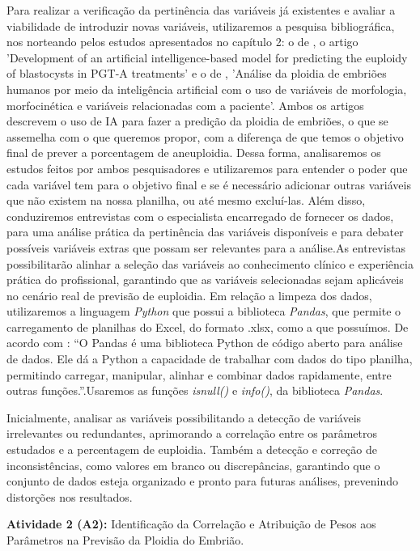Para realizar a verificação da pertinência das variáveis já existentes e avaliar a viabilidade de introduzir novas variáveis, utilizaremos a pesquisa bibliográfica, nos norteando pelos estudos apresentados no capítulo 2: o de , o artigo 'Development of an artificial intelligence-based model for predicting the euploidy of blastocysts in PGT-A treatments' e o de , 'Análise da ploidia de embriões humanos por meio da inteligência artificial com o uso de variáveis de morfologia, morfocinética e variáveis relacionadas com a paciente'. Ambos os artigos descrevem o uso de IA para fazer a predição da ploidia de embriões, o que se assemelha com o que queremos propor, com a diferença de que temos o objetivo final de prever a porcentagem de aneuploidia. Dessa forma, analisaremos os estudos feitos por ambos pesquisadores e utilizaremos para entender o poder que cada variável tem para o objetivo final e se é necessário adicionar outras variáveis que não existem na nossa planilha, ou até mesmo excluí-las. Além disso, conduziremos entrevistas com o especialista encarregado de fornecer os dados, para uma análise prática da pertinência das variáveis disponíveis e para debater possíveis variáveis extras que possam ser relevantes para a análise.As entrevistas possibilitarão alinhar a seleção das variáveis ao conhecimento clínico e experiência prática do profissional, garantindo que as variáveis selecionadas sejam aplicáveis no cenário real de previsão de euploidia. Em relação a limpeza dos dados, utilizaremos a linguagem \textit{Python} que possui a biblioteca \textit{Pandas}, que permite o carregamento de planilhas do Excel, do formato .xlsx, como a que possuímos. De acordo com : “O Pandas é uma biblioteca Python de código aberto para análise de dados. Ele dá a Python a capacidade de trabalhar com dados do tipo planilha, permitindo carregar, manipular, alinhar e combinar dados rapidamente, entre outras funções.”.Usaremos as funções \textit{isnull()} e \textit{info()}, da biblioteca \textit{Pandas}.

Inicialmente, analisar as variáveis possibilitando a detecção de variáveis irrelevantes ou redundantes, aprimorando a correlação entre os parâmetros estudados e a percentagem de euploidia. Também a detecção e correção de inconsistências, como valores em branco ou discrepâncias, garantindo que o conjunto de dados esteja organizado e pronto para futuras análises, prevenindo distorções nos resultados. 

\textbf{Atividade 2 (A2):} Identificação da Correlação e Atribuição de Pesos aos Parâmetros na Previsão da Ploidia do Embrião.

